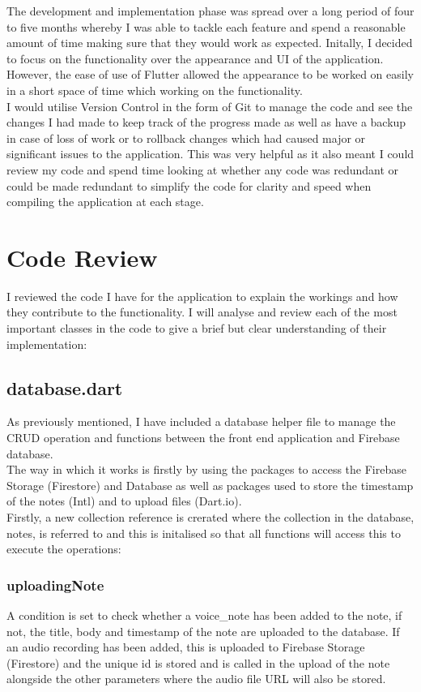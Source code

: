 \documentclass[oneside]{report}
\begin{document}
The development and implementation phase was spread over a long period of four to five months whereby I was able to tackle each feature and spend a reasonable amount of time making sure that they would work as expected. Initally, I decided to focus on the functionality over the appearance and UI of the application. However, the ease of use of Flutter allowed the appearance to be worked on easily in a short space of time which working on the functionality. \\

I would utilise Version Control in the form of Git to manage the code and see the changes I had made to keep track of the progress made as well as have a backup in case of loss of work or to rollback changes which had caused major or significant issues to the application. This was very helpful as it  also meant I could review my code and spend time looking at whether any code was redundant or could be made redundant to simplify the code for clarity and speed when compiling the application at each stage.

	\section{Code Review}
	I reviewed the code I have for the application to explain the workings and how they contribute to the functionality. I will analyse and review each of the most important classes in the code to give a brief but clear understanding of their implementation:

		\subsection{database.dart}
		As previously mentioned, I have included a database helper file to manage the CRUD operation and functions between the front end application and Firebase database.\\

The way in which it works is firstly by using the packages to access the Firebase Storage (Firestore) and Database as well as packages used to store the timestamp of the notes (Intl) and to upload files (Dart.io).\\

Firstly, a new collection reference is crerated where the collection in the database, notes, is referred to and this is initalised so that all functions will access this to execute the operations:

			\subsubsection{uploadingNote}
			A condition is set to check whether a voice\_note has been added to the note, if not, the title, body and timestamp of the note are uploaded to the database. If an audio recording has been added, this is uploaded to Firebase Storage (Firestore) and the unique id is stored and is called in the upload of the note alongside the other parameters where the audio file URL will also be stored. 
\end{document}
